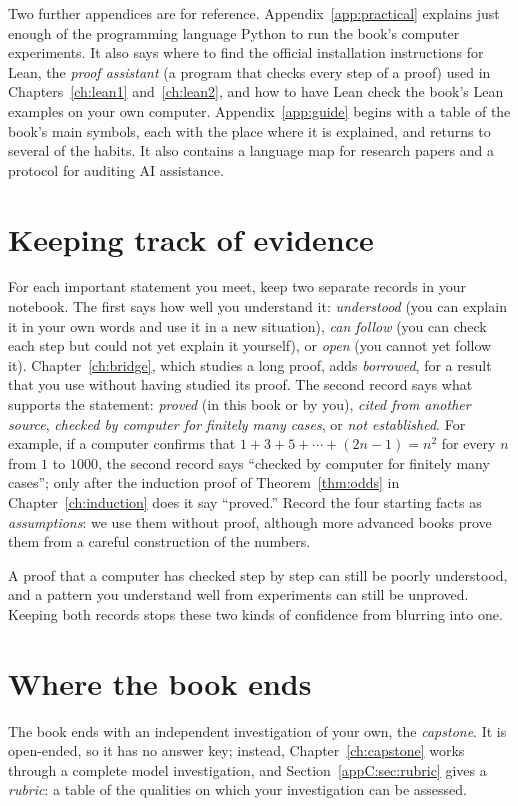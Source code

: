 Two further appendices are for reference. Appendix~\ref{app:practical} explains just enough of the programming language Python to run the book's computer experiments. It also says where to find the official installation instructions for Lean, the \emph{proof assistant} (a program that checks every step of a proof) used in Chapters~\ref{ch:lean1} and~\ref{ch:lean2}, and how to have Lean check the book's Lean examples on your own computer. Appendix~\ref{app:guide} begins with a table of the book's main symbols, each with the place where it is explained, and returns to several of the habits. It also contains a language map for research papers and a protocol for auditing AI assistance.

\section*{Keeping track of evidence}
For each important statement you meet, keep two separate records in your notebook. The first says how well you understand it: \emph{understood} (you can explain it in your own words and use it in a new situation), \emph{can follow} (you can check each step but could not yet explain it yourself), or \emph{open} (you cannot yet follow it). Chapter~\ref{ch:bridge}, which studies a long proof, adds \emph{borrowed}, for a result that you use without having studied its proof. The second record says what supports the statement: \emph{proved} (in this book or by you), \emph{cited from another source}, \emph{checked by computer for finitely many cases}, or \emph{not established}. For example, if a computer confirms that $1+3+5+\cdots+(2n-1)=n^2$ for every $n$ from $1$ to $1000$, the second record says ``checked by computer for finitely many cases''; only after the induction proof of Theorem~\ref{thm:odds} in Chapter~\ref{ch:induction} does it say ``proved.'' Record the four starting facts as \emph{assumptions}: we use them without proof, although more advanced books prove them from a careful construction of the numbers.

A proof that a computer has checked step by step can still be poorly understood, and a pattern you understand well from experiments can still be unproved. Keeping both records stops these two kinds of confidence from blurring into one.

\section*{Where the book ends}
The book ends with an independent investigation of your own, the \emph{capstone}. It is open-ended, so it has no answer key; instead, Chapter~\ref{ch:capstone} works through a complete model investigation, and Section~\ref{appC:sec:rubric} gives a \emph{rubric}: a table of the qualities on which your investigation can be assessed.

